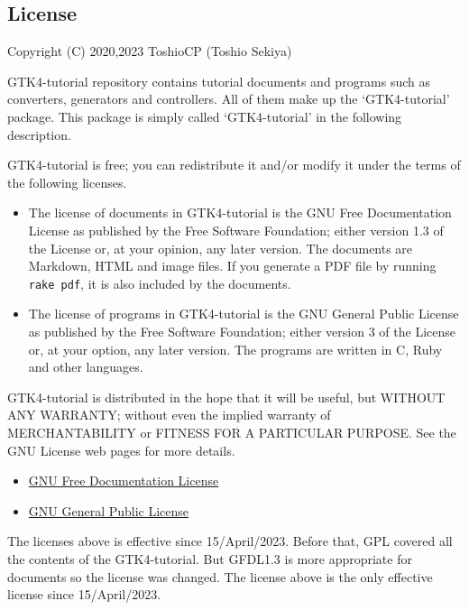 \subsection{License}\label{license}

Copyright (C) 2020,2023 ToshioCP (Toshio Sekiya)

GTK4-tutorial repository contains tutorial documents and programs such
as converters, generators and controllers. All of them make up the
`GTK4-tutorial' package. This package is simply called `GTK4-tutorial'
in the following description.

GTK4-tutorial is free; you can redistribute it and/or modify it under
the terms of the following licenses.

\begin{itemize}
\tightlist
\item
  The license of documents in GTK4-tutorial is the GNU Free
  Documentation License as published by the Free Software Foundation;
  either version 1.3 of the License or, at your opinion, any later
  version. The documents are Markdown, HTML and image files. If you
  generate a PDF file by running \passthrough{\lstinline!rake pdf!}, it
  is also included by the documents.
\item
  The license of programs in GTK4-tutorial is the GNU General Public
  License as published by the Free Software Foundation; either version 3
  of the License or, at your option, any later version. The programs are
  written in C, Ruby and other languages.
\end{itemize}

GTK4-tutorial is distributed in the hope that it will be useful, but
WITHOUT ANY WARRANTY; without even the implied warranty of
MERCHANTABILITY or FITNESS FOR A PARTICULAR PURPOSE. See the GNU License
web pages for more details.

\begin{itemize}
\tightlist
\item
  \href{https://www.gnu.org/licenses/fdl-1.3.html}{GNU Free
  Documentation License}
\item
  \href{https://www.gnu.org/licenses/gpl-3.0.html}{GNU General Public
  License}
\end{itemize}

The licenses above is effective since 15/April/2023. Before that, GPL
covered all the contents of the GTK4-tutorial. But GFDL1.3 is more
appropriate for documents so the license was changed. The license above
is the only effective license since 15/April/2023.
